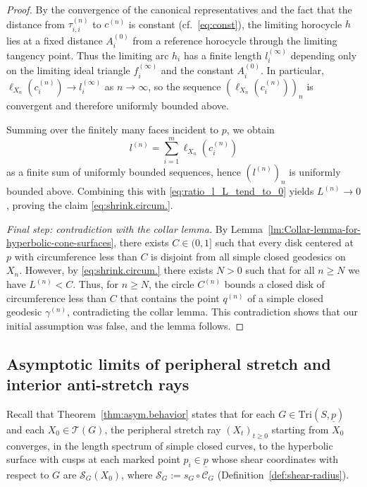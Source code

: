 \documentclass[11pt, letterpaper]{amsart}
\theoremstyle{definition}
\theoremstyle{remark}
\newcommand{\up}{\underline{p}}
\newcommand{\Sp}{(S,\up)}
\newcommand{\TSp}{\text{Tri}\Sp}
\newcommand{\cC}{\mathcal{C}}
\newcommand{\cTG}{\mathcal{T} (G)}
\newcommand{\cS}{\mathcal{S}}
\numberwithin{equation}{section}
\begin{document}
\begin{proof}
By the convergence of the canonical representatives and the fact that the distance from \(\tau_{i,i}^{(n)}\) to \(c^{(n)}\) is constant (cf.\ \eqref{eq:const}), the limiting horocycle \(h\) lies at a fixed distance \(A_i^{(0)}\) from a reference horocycle through the limiting tangency point.
Thus the limiting arc \(h_i\) has a finite length \(l_i^{(\infty)}\) depending only on the limiting ideal triangle \(f_i^{(\infty)}\) and the constant \(A_i^{(0)}\).
In particular, \(\ell_{X_n}(c_i^{(n)}) \to l_i^{(\infty)}\) as \(n\to\infty\), so the sequence \((\ell_{X_n}(c_i^{(n)}))_n\) is convergent and therefore uniformly bounded above.



Summing over the finitely many faces incident to \(p\), we obtain
\[
  l^{(n)} = \sum_{i=1}^m \ell_{X_n}(c_i^{(n)})
\]
as a finite sum of uniformly bounded sequences, hence \((l^{(n)})_n\) is uniformly bounded above.
Combining this with \eqref{eq:ratio_l_L_tend_to_0} yields \(L^{(n)} \to 0\), proving the claim \eqref{eq:shrink.circum.}.

\medskip\noindent
\emph{Final step: contradiction with the collar lemma.}
By Lemma~\ref{lm:Collar-lemma-for-hyperbolic-cone-surfaces}, there exists \(C \in (0,1]\) such that every disk centered at \(p\) with circumference less than \(C\) is disjoint from all simple closed geodesics on \(X_n\).
However, by \eqref{eq:shrink.circum.} there exists \(N>0\) such that for all \(n \ge N\) we have \(L^{(n)} < C\).
Thus, for \(n\ge N\), the circle \(C^{(n)}\) bounds a closed disk of circumference less than \(C\) that contains the point $q^{(n)}$ of a simple closed geodesic $\gamma^{(n)}$, contradicting the collar lemma.
This contradiction shows that our initial assumption was false, and the lemma follows.
\end{proof}

\subsection{Asymptotic limits of peripheral stretch and interior anti-stretch rays}

Recall that Theorem~\ref{thm:asym.behavior} states that for each \(G\in\TSp\) and each \(X_0\in\cTG\), the peripheral stretch ray \((X_t)_{t\geq 0}\) starting from \(X_0\) converges, in the length spectrum of simple closed curves, to the hyperbolic surface with cusps at each marked point \(p_i\in \up\) whose shear coordinates with respect to \(G\) are \(\cS_G(X_0)\), where \(\cS_G:=s_G\circ\cC_G\) (Definition~\ref{def:shear-radius}).
\end{document}
